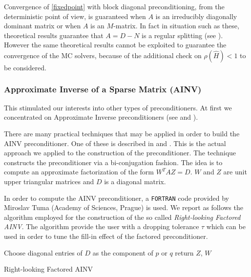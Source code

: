 \documentclass[a4paper,10pt]{article}
\begin{document}
Convergence of \ref{fixedpoint} with block diagonal preconditioning, from the 
deterministic point of view, is guaranteed when $A$ is an irreducibly 
diagonally dominant matrix or when $A$ is an $M$-matrix. In fact in situation 
such as these, theoretical results guarantee that $A=D-N$ is a regular 
splitting (see \cite{Ax1996}). However the same theoretical results cannot be 
exploited to guarantee the convergence of the MC solvers, because of the 
additional check on $\rho(\hat{H})<1$ to be considered.

\subsubsection*{Approximate Inverse of a Sparse Matrix (AINV)}

This stimulated our interests into other types of preconditioners. At first we 
concentrated on Approximate Inverse preconditioners (see \cite{Saad} and 
\cite{Benzi2002}). 

There are many practical techniques that may be applied in order to build the 
AINV preconditioner.
One of these is described in \cite{Tuma1996} and \cite{Tuma1998}.
This is the actual approach we applied to the construction of the 
preconditioner. The technique constructs the preconditioner via a 
bi-conjugation fashion.
The idea is to compute an approximate factorization of the form $W^T A Z=D$. 
$W$ and $Z$ are unit upper triangular matrices and $D$ is a diagonal matrix.

In order to compute the AINV preconditioner, a \texttt{FORTRAN} code 
provided by Miroslav Tuma (Academy of Sciences, Prague) is used. 
We report as follows the algorithm employed for the construction of the so 
called \textit{Right-looking Factored AINV}. The algorithm provide the user 
with a dropping tolerance $\tau$ which can be used in order to tune the fill-in 
effect 
of the factored preconditioner. \newline

\begin{algorithm}[H]
 \;
 Choose diagonal entries of $D$ as the component of $p$ or $q$\;
 return $Z$, $W$\; 
 \caption{Right-looking Factored AINV}
\end{algorithm}
\end{document}
